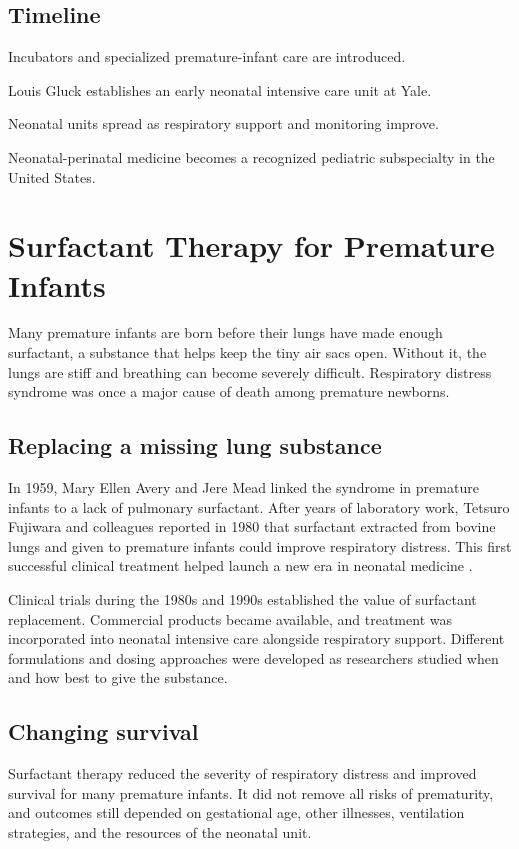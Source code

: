 \documentclass[12pt,oneside]{book}
\begin{document}
\section*{Timeline}
\begin{description}[leftmargin=2.3cm,style=nextline]
  \item[Late 1800s] Incubators and specialized premature-infant care are introduced.
  \item[1960] Louis Gluck establishes an early neonatal intensive care unit at Yale.
  \item[1960s--1970s] Neonatal units spread as respiratory support and monitoring improve.
  \item[1975] Neonatal-perinatal medicine becomes a recognized pediatric subspecialty in the United States.
\end{description}
\chapter[Surfactant Therapy for Premature Infants]{Surfactant Therapy for Premature Infants}

Many premature infants are born before their lungs have made enough
surfactant, a substance that helps keep the tiny air sacs open. Without it,
the lungs are stiff and breathing can become severely difficult. Respiratory
distress syndrome was once a major cause of death among premature newborns.

\section{Replacing a missing lung substance}
In 1959, Mary Ellen Avery and Jere Mead linked the syndrome in premature infants to a lack of pulmonary surfactant. After years of laboratory work, Tetsuro Fujiwara and colleagues reported in 1980 that surfactant extracted from bovine lungs and given to premature infants could improve respiratory distress. This first successful clinical treatment helped launch a new era in neonatal medicine \cite{surfactantHistory,surfactantFujiwara}.

Clinical trials during the 1980s and 1990s established the value of surfactant
replacement. Commercial products became available, and treatment was
incorporated into neonatal intensive care alongside respiratory support.
Different formulations and dosing approaches were developed as researchers
studied when and how best to give the substance.

\section{Changing survival}
Surfactant therapy reduced the severity of respiratory distress and improved survival for many premature infants. It did not remove all risks of prematurity, and outcomes still depended on gestational age, other illnesses, ventilation strategies, and the resources of the neonatal unit.
\end{document}
